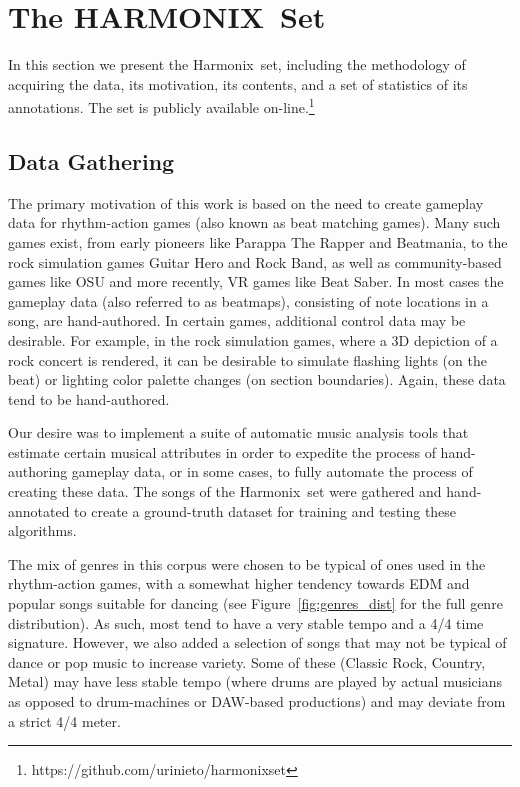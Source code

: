 \documentclass{article}
\newcommand{\setNameUpper}{HARMONIX}
\newcommand{\setName}{Harmonix}
\begin{document}
\section{The \setNameUpper~Set}\label{sec:dataset}

In this section we present the \setName~set, including the methodology of acquiring the data, its motivation, its contents, and a set of statistics of its annotations.
The set is publicly available on-line.\footnote{https://github.com/urinieto/harmonixset}

\subsection{Data Gathering}

The primary motivation of this work is based on the need to create gameplay data for rhythm-action games (also known as beat matching games). Many such games exist, from early pioneers like Parappa The Rapper and Beatmania, to the rock simulation games Guitar Hero and Rock Band, as well as community-based games like OSU and more recently, VR games like Beat Saber. In most cases the gameplay data (also referred to as beatmaps), consisting of note locations in a song, are hand-authored. In certain games, additional control data may be desirable. For example, in the rock simulation games, where a 3D depiction of a rock concert is rendered, it can be desirable to simulate flashing lights (on the beat) or lighting color palette changes (on section boundaries). Again, these data tend to be hand-authored.

Our desire was to implement a suite of automatic music analysis tools that estimate certain musical attributes in order to expedite the process of hand-authoring gameplay data, or in some cases, to fully automate the process of creating these data. The songs of the \setName~set were gathered and hand-annotated to create a ground-truth dataset for training and testing these algorithms.

The mix of genres in this corpus were chosen to be typical of ones used in the rhythm-action games, with a somewhat higher tendency towards EDM and popular songs suitable for dancing (see Figure~\ref{fig:genres_dist} for the full genre distribution).
As such, most tend to have a very stable tempo and a 4/4 time signature. 
However, we also added a selection of songs that may not be typical of dance or pop music to increase variety.
Some of these (Classic Rock, Country, Metal) may have less stable tempo (where drums are played by actual musicians as opposed to drum-machines or DAW-based productions) and may deviate from a strict 4/4 meter. 
\end{document}
